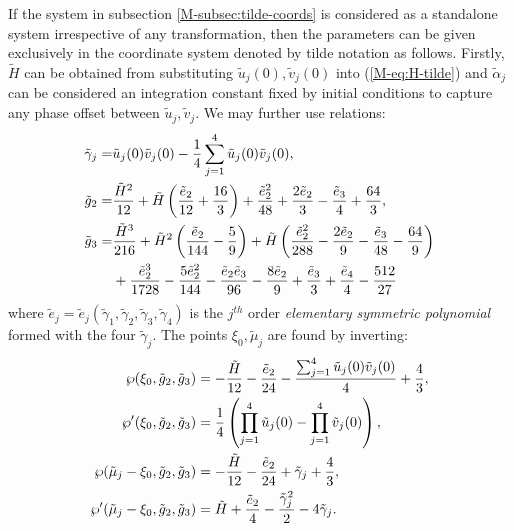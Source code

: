 \documentclass[11pt,a4paper]{article}
\newcommand{\externaleqref}[1]{\textup{(\ref*{#1})}}
\begin{document}
If the system in subsection \ref*{M-subsec:tilde-coords} is considered as a standalone system irrespective of any transformation,
then the parameters can be given exclusively in the coordinate system denoted by tilde notation as follows.
Firstly, $\tilde{H}$ can be obtained from substituting $\tilde{u}_j{\left(0\right)}, \tilde{v}_j{\left(0 \right)}$ into \externaleqref{M-eq:H-tilde}
and $\tilde{\alpha}_j$ can be considered an integration constant fixed by initial conditions to capture any phase offset between $\tilde{u}_j, \tilde{v}_j$.
We may further use relations:
\begin{align}
\tilde{\gamma}_{j} =& \tilde{u}_j{\left(0\right)} \tilde{v}_j{\left(0 \right)} - \frac{1}{4}\sum_{j=1}^{4} \tilde{u}_j{\left(0\right)} \tilde{v}_j{\left(0\right)}, \notag \\
\tilde{g}_{2} =& \frac{\tilde{H}^{2}}{12} + \tilde{H} \left(\frac{{\tilde{e}}_{2}}{12} + \frac{16}{3}\right) + \frac{{\tilde{e}}_{2}^{2}}{48} + \frac{2 {\tilde{e}}_{2}}{3} - \frac{{\tilde{e}}_{3}}{4} + \frac{64}{3}, \notag \\
\tilde{g}_{3} =& \frac{\tilde{H}^{3}}{216} + \tilde{H}^{2} \left(\frac{{\tilde{e}}_{2}}{144} - \frac{5}{9}\right) + \tilde{H} \left(\frac{{\tilde{e}}_{2}^{2}}{288} - \frac{2 {\tilde{e}}_{2}}{9} - \frac{{\tilde{e}}_{3}}{48} - \frac{64}{9}\right) \notag \\
&+ \frac{{\tilde{e}}_{2}^{3}}{1728} - \frac{5 {\tilde{e}}_{2}^{2}}{144} - \frac{{\tilde{e}}_{2} {\tilde{e}}_{3}}{96} - \frac{8 {\tilde{e}}_{2}}{9} + \frac{{\tilde{e}}_{3}}{3} + \frac{{\tilde{e}}_{4}}{4} - \frac{512}{27}
\end{align}
where $\tilde{e}_j=\tilde{e}_j\left(\tilde{\gamma}_1, \tilde{\gamma}_2, \tilde{\gamma}_3, \tilde{\gamma}_4\right)$ is the $j^{th}$ order \emph{elementary symmetric polynomial} formed with the four $\tilde{\gamma}_j$. The points $\xi_0, \tilde{\mu}_j$ are found by inverting:
\begin{align}
\wp{\left(\xi_{0},\tilde{g}_{2},\tilde{g}_{3} \right)} &= - \frac{\tilde{H}}{12} - \frac{{\tilde{e}}_{2}}{24} - \frac{\sum_{j=1}^{4} \tilde{u}_j{\left(0\right)} \tilde{v}_j{\left(0\right)}}{4} + \frac{4}{3}, \notag \\
\wp'{\left(\xi_{0},\tilde{g}_{2},\tilde{g}_{3} \right)} &= \frac{1}{4}\left(\prod_{j=1}^{4}{\tilde{u}_j(0)} - \prod_{j=1}^{4}{\tilde{v}_j(0)}\right), \notag \\
\wp{\left({\tilde{\mu}}_{j} - \xi_{0},\tilde{g}_{2},\tilde{g}_{3} \right)} &= - \frac{\tilde{H}}{12} - \frac{{\tilde{e}}_{2}}{24} + {\tilde{\gamma}}_{j} + \frac{4}{3}, \notag \\
\wp'{\left({\tilde{\mu}}_{j} - \xi_{0},\tilde{g}_{2},\tilde{g}_{3} \right)} &= \tilde{H} + \frac{{\tilde{e}}_{2}}{4} - \frac{{\tilde{\gamma}}_{j}^{2}}{2} - 4 {\tilde{\gamma}}_{j}.
\end{align}
\end{document}
